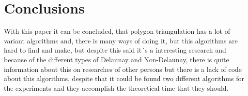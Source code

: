 \documentclass[conference]{IEEEtran}
\begin{document}
\section{Conclusions}
With this paper it can be concluded, that polygon triangulation has a lot of variant algorithms and, there is many ways of doing it, but this algorithms are hard to find and make, but despite this said it´s a interesting research and because of the different types of Delaunay and Non-Delaunay, there is quite information about this on researches of other persons but there is a lack of code about this algorithms, despite that it could be found two different algorithms for the experiments and they accomplish the theoretical time that they should.



\end{document}

